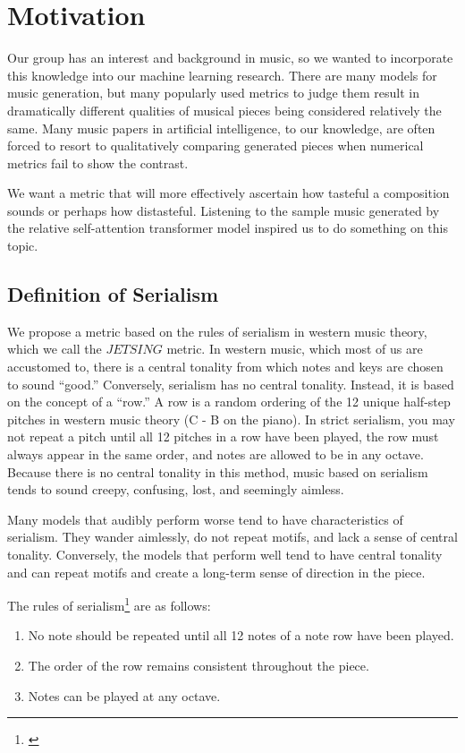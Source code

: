 \documentclass[11pt]{article}
\begin{document}
\section{Motivation}
Our group has an interest and background in music, so we wanted to incorporate this knowledge into our machine learning research.
There are many models for music generation, but many popularly used metrics to judge them result in dramatically different qualities of musical pieces being considered relatively the same.
Many music papers in artificial intelligence, to our knowledge, are often forced to resort to qualitatively comparing generated pieces when numerical metrics fail to show the contrast.

We want a metric that will more effectively ascertain how tasteful a composition sounds or perhaps how distasteful.
Listening to the sample music generated by the relative self-attention transformer model inspired us to do something on this topic.

\subsection{Definition of Serialism}

We propose a metric based on the rules of serialism in western music theory, which we call the $JETSING$ metric.
In western music, which most of us are accustomed to, there is a central tonality from which notes and keys are chosen to sound “good.”
Conversely, serialism has no central tonality. Instead, it is based on the concept of a “row.”
A row is a random ordering of the 12 unique half-step pitches in western music theory (C - B on the piano).
In strict serialism, you may not repeat a pitch until all 12 pitches in a row have been played, the row must always appear in the same order, and notes are allowed to be in any octave.
Because there is no central tonality in this method, music based on serialism tends to sound creepy, confusing, lost, and seemingly aimless.

Many models that audibly perform worse tend to have characteristics of serialism.
They wander aimlessly, do not repeat motifs, and lack a sense of central tonality.
Conversely, the models that perform well tend to have central tonality and can repeat motifs and create a long-term sense of direction in the piece.

The rules of serialism\footnote{\citep{whittall2008serialism}} are as follows:
\begin{enumerate}
    \item No note should be repeated until all 12 notes of a note row have been played.
    \item The order of the row remains consistent throughout the piece.
    \item Notes can be played at any octave.
\end{enumerate}
\end{document}
